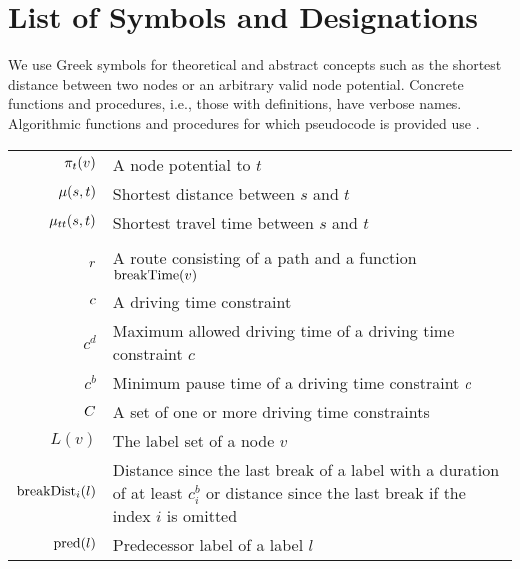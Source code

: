 \section{List of Symbols and Designations}
\label{app:symbols}

We use Greek symbols for theoretical and abstract concepts such as the shortest distance between two nodes or an arbitrary valid node potential. Concrete functions and procedures, i.e., those with definitions, have verbose names. Algorithmic functions and procedures for which pseudocode is provided use .

\begin{tabular}{rp{}}
	$\pi_t(v)$         & A node potential to $t$                                                                                                                   \\
	$\mu(s,t)$          & Shortest distance between $s$ and $t$                                                                                                     \\
	$\mu_{tt}(s,t)$        & Shortest travel time between $s$ and $t$                                                                                                  \\
	\\
	$r$                  & A route consisting of a path and a function $\operatorname{breakTime}(v)$                                                                               \\
	$c$                  & A driving time constraint                                                                                                                 \\
	$c^d$                     & Maximum allowed driving time of a driving time constraint $c$                                                                             \\
	$c^b$                     & Minimum pause time of a driving time constraint $c$                                                                                  \\
	$C$               & A set of one or more driving time constraints                                                                                             \\
	$L(v)$                    & The label set of a node $v$                                                                                                               \\
	$\operatorname{breakDist}_i(l)$         & Distance since the last break of a label with a duration of at least $c_i^b$ or distance since the last break if the index $i$ is omitted \\
	$\operatorname{pred}(l)$                & Predecessor label of a label $l$                                                                                                          \\


\end{tabular}
